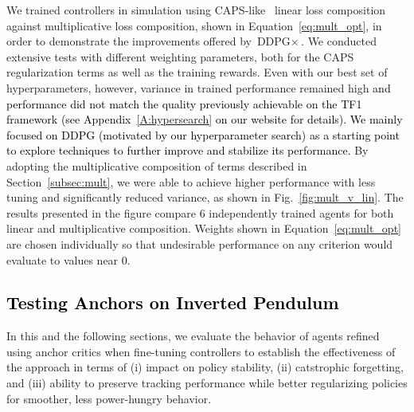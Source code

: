 \documentclass[letterpaper, 10 pt, conference]{ieeeconf} %
\newcommand{\DDPGx}{$\text{DDPG}\times$}
\newcommand{\rev}[1]{\textcolor{black}{#1}}
\begin{document}
        We trained controllers in simulation using CAPS-like~\cite{mysore2021caps} linear loss composition against multiplicative loss composition, shown in Equation~\ref{eq:mult_opt}, in order to demonstrate the improvements offered by \DDPGx{}.
        We conducted extensive tests with different weighting parameters, both for the CAPS regularization terms as well as the training rewards.
        Even with our best set of hyperparameters, however, variance in trained performance remained high \rev{and performance did not match the quality previously achievable on the TF1 framework (see Appendix~\ref{A:hypersearch} on our website \cite{supplementary} for details).
        We mainly focused on DDPG (motivated by our hyperparameter search) as a starting point to explore techniques to further improve and stabilize its performance.
        }
        By adopting the multiplicative composition of terms described in Section~\ref{subsec:mult}, we were able to achieve higher performance with less tuning and significantly reduced variance, as shown in Fig.~\ref{fig:mult_v_lin}.
        The results presented in the figure compare 6 independently trained agents for both linear and multiplicative composition.
        Weights shown in Equation~\ref{eq:mult_opt} are chosen individually so that undesirable performance on any criterion would evaluate to values near 0.
        
    \subsection{\rev{Testing Anchors on Inverted Pendulum}}\label{subsec:invPend}


    In this and the following sections, we evaluate the behavior of agents refined using anchor critics when fine-tuning controllers to establish the effectiveness of the approach in terms of (i) impact on policy stability, (ii) catstrophic forgetting, and (iii) ability to preserve tracking performance while better regularizing policies for smoother, less power-hungry behavior.
    
\end{document}
